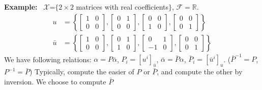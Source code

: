 \documentclass[letterpaper]{article}
\begin{document}
\noindent \textbf{Example:}~ $\mathcal{X}$=$\{2\times2$ matrices with real coefficients$\}$, $\mathcal{F}=\mathbb{R}$.
    \begin{align*}
        u&=\left\{ \left[\begin{array}{cc}
            1 & 0\\
            0 & 0
            \end{array}\right],\left[\begin{array}{cc}
            0 & 1\\
            0 & 0
            \end{array}\right],\left[\begin{array}{cc}
            0 & 0\\
            1 & 0
            \end{array}\right],\left[\begin{array}{cc}
            0 & 0\\
            0 & 1
            \end{array}\right]\right\}\\
        \bar{u}&=\left\{ \left[\begin{array}{cc}
            1 & 0\\
            0 & 0
            \end{array}\right],\left[\begin{array}{cc}
            0 & 1\\
            1 & 0
            \end{array}\right],\left[\begin{array}{cc}
            0 & 1\\
            -1 & 0
            \end{array}\right],\left[\begin{array}{cc}
            0 & 0\\
            0 & 1
        \end{array}\right]\right\}
    \end{align*}
    We have following relations:
    \newline
    $\alpha=P\bar{\alpha}$, $P_i=[u^i]_{\bar{u}}$, $\bar{\alpha}=\bar{P}\alpha$, $\bar{P}_i=[\bar{u}^i]_u$. ($\bar{P}^{-1}=P$, $P^{-1}=\bar{P}$)
    \newline
    Typically, compute the easier of $P$ or $\bar{P}$, and compute the other by inversion.
    \newline
    We choose to compute $\bar{P}$
\end{document}
